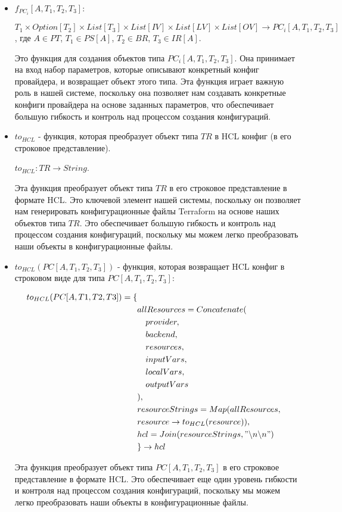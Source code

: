 \begin{itemize}
\item $f_{PC_i}[A, T_1, T_2, T_3]:$

$T_1 \times Option[T_2] \times List[T_3] \times List[IV] \times List[LV] \times
List[OV] \rightarrow PC_i[A, T_1, T_2, T_3]$, где $A \in PT$, $T_1 \in PS[A]$,
$T_2 \in BR$, $T_3 \in IR[A]$.

Это функция для создания объектов типа $PC_i[A, T_1, T_2, T_3]$. Она принимает
на вход набор параметров, которые описывают конкретный конфиг провайдера, и
возвращает объект этого типа. Эта функция играет важную роль в нашей системе,
поскольку она позволяет нам создавать конкретные конфиги провайдера на основе
заданных параметров, что обеспечивает большую гибкость и контроль над процессом
создания конфигураций.

\item $to_{HCL}$ - функция, которая преобразует объект типа $TR$ в HCL конфиг (в
его строковое представление).

$to_{HCL}: TR \rightarrow String$.

Эта функция преобразует объект типа $TR$ в его строковое представление в формате
HCL. Это ключевой элемент нашей системы, поскольку он позволяет нам генерировать
конфигурационные файлы Terraform на основе наших объектов типа $TR$. Это
обеспечивает большую гибкость и контроль над процессом создания конфигураций,
поскольку мы можем легко преобразовать наши объекты в конфигурационные файлы.

\item $to_{HCL}(PC[A, T_1, T_2, T_3])$ - функция, которая возвращает HCL конфиг
в строковом виде для типа $PC[A, T_1, T_2, T_3]$:

\begin{align*}
  to_{HCL}(PC[A, T1, T2, T3]) = \{ \\
  &allResources = Concatenate( \\
  &\quad provider, \\
  &\quad backend, \\
  &\quad resources, \\
  &\quad inputVars, \\
  &\quad localVars, \\
  &\quad outputVars \\
  &), \\
  &resourceStrings = Map(allResources, \\
  &resource \rightarrow to_{HCL}(resource)), \\
  &hcl = Join(resourceStrings, "\backslash n \backslash n") \\
  &\} \rightarrow hcl
\end{align*}

Эта функция преобразует объект типа $PC[A, T_1, T_2, T_3]$ в его строковое
представление в формате HCL. Это обеспечивает еще один уровень гибкости и
контроля над процессом создания конфигураций, поскольку мы можем легко
преобразовать наши объекты в конфигурационные файлы.

\end{itemize}

